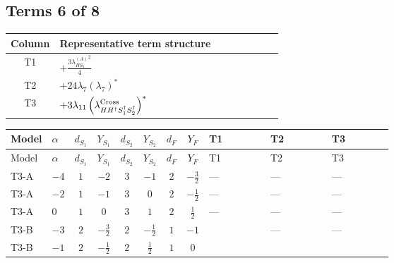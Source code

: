 \documentclass[8pt]{article}
\begin{document}
\begin{landscape}
\subsection*{Terms 6 of 8}
\begin{center}
\begin{tabular}{@{}c >{\raggedright\arraybackslash}p{0.82\linewidth}@{}}
\toprule
Column & Representative term structure \\
\midrule
T1 & \(\displaystyle +\frac{3 {\lambda_{HS_1}^{(A)}}^2}{4}\) \\
\midrule
T2 & \(\displaystyle +24 {\lambda_{7}} \left({\lambda_{7}}\right)^{*}\) \\
\midrule
T3 & \(\displaystyle +3 {\lambda_{11}} \left({\lambda_{H H^\dagger S_1^\dagger S_2^\dagger}^{\rm Cross}}\right)^{*}\) \\
\midrule
\bottomrule
\end{tabular}
\end{center}
\smallskip
\tiny
\begin{longtable}{@{}llcccccc >{\raggedright\arraybackslash}p{0.21\linewidth} >{\raggedright\arraybackslash}p{0.21\linewidth} >{\raggedright\arraybackslash}p{0.21\linewidth}@{}}
\toprule
Model & $\alpha$ & $d_{S_1}$ & $Y_{S_1}$ & $d_{S_2}$ & $Y_{S_2}$ & $d_F$ & $Y_F$ & T1 & T2 & T3 \\
\midrule
\endfirsthead
\toprule
Model & $\alpha$ & $d_{S_1}$ & $Y_{S_1}$ & $d_{S_2}$ & $Y_{S_2}$ & $d_F$ & $Y_F$ & T1 & T2 & T3 \\
\midrule
\endhead
T3-A & $-4$ & $1$ & $-2$ & $3$ & $-1$ & $2$ & $-\frac{3}{2}$ & --- & --- & --- \\
\midrule
T3-A & $-2$ & $1$ & $-1$ & $3$ & $0$ & $2$ & $-\frac{1}{2}$ & --- & --- & --- \\
\midrule
T3-A & $0$ & $1$ & $0$ & $3$ & $1$ & $2$ & $\frac{1}{2}$ & --- & --- & --- \\
\midrule
T3-B & $-3$ & $2$ & $-\frac{3}{2}$ & $2$ & $-\frac{1}{2}$ & $1$ & $-1$ & \scriptsize\adjustbox{max width=\linewidth}{$\begin{gathered} +\frac{3 {\lambda_{HS_1}^{(A)}}^2}{4}\end{gathered}$} & --- & --- \\
\midrule
T3-B & $-1$ & $2$ & $-\frac{1}{2}$ & $2$ & $\frac{1}{2}$ & $1$ & $0$ & \scriptsize\adjustbox{max width=\linewidth}{$\begin{gathered} +\frac{3 {\lambda_{HS_1}^{(A)}}^2}{4}\end{gathered}$} & \scriptsize\adjustbox{max width=\linewidth}{$\begin{gathered} +24 {\lambda_{7}} \left({\lambda_{7}}\right)^{*}\end{gathered}$} & \scriptsize\adjustbox{max width=\linewidth}{$\begin{gathered} +3 {\lambda_{11}} \left({\lambda_{H H^\dagger S_1^\dagger S_2^\dagger}^{\rm Cross}}\right)^{*}\end{gathered}$} \\

\end{longtable}
\end{landscape}
\end{document}
